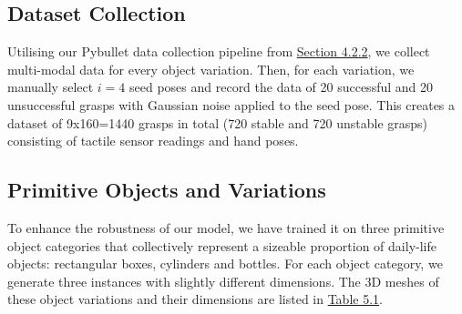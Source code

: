 \documentclass[11pt, a4paper]{report}
\begin{document}
\subsection{Dataset Collection}\label{sec:5.2.1}
Utilising our Pybullet data collection pipeline from \hyperref[sec:4.2.2]{Section 4.2.2}, we collect multi-modal data for every object variation. Then, for each variation, we manually select $i=4$ seed poses and record the data of 20 successful and 20 unsuccessful grasps with Gaussian noise applied to the seed pose. This creates a dataset of 9x160=1440 grasps in total (720 stable and 720 unstable grasps) consisting of tactile sensor readings and hand poses.


\subsection{Primitive Objects and Variations}\label{sec:5.2.2}
To enhance the robustness of our model, we have trained it on three primitive object categories that collectively represent a sizeable proportion of daily-life objects: rectangular boxes, cylinders and bottles. For each object category, we generate three instances with slightly different dimensions. The 3D meshes of these object variations and their dimensions are listed in \hyperref[tbl:5.1]{Table 5.1}.
\end{document}
